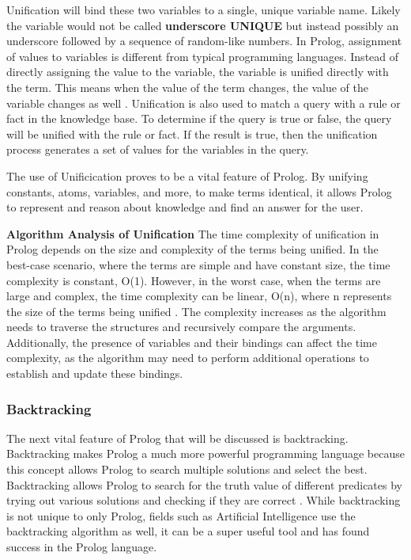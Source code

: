 \documentclass{article}
\theoremstyle{theorem}
\theoremstyle{definition}
\theoremstyle{remark}
\begin{document}
\noindent\newline Unification will bind these two variables to a single, unique variable name. Likely the variable would not be called \textbf{underscore UNIQUE} but instead possibly an underscore followed by a sequence of random-like numbers.  In Prolog, assignment of values to variables is different from typical programming languages. Instead of directly assigning the value to the variable, the variable is unified directly with the term. This means when the value of the term changes, the value of the variable changes as well \cite{(13)}. Unification is also used to match a query with a rule or fact in the knowledge base. To determine if the query is true or false, the query will be unified with the rule or fact. If the result is true, then the unification process generates a set of values for the variables in the query. 

\noindent\newline The use of Unificication proves to be a vital feature of Prolog. By unifying constants, atoms, variables, and more, to make terms identical, it allows Prolog to represent and reason about knowledge and find an answer for the user.


\noindent\newline\newline\textbf{Algorithm Analysis of Unification}
\noindent\newline The time complexity of unification in Prolog depends on the size and complexity of the terms being unified. In the best-case scenario, where the terms are simple and have constant size, the time complexity is constant, O(1). However, in the worst case, when the terms are large and complex, the time complexity can be linear, O(n), where n represents the size of the terms being unified \cite{(14)}. The complexity increases as the algorithm needs to traverse the structures and recursively compare the arguments. Additionally, the presence of variables and their bindings can affect the time complexity, as the algorithm may need to perform additional operations to establish and update these bindings.



\subsubsection{Backtracking}
\noindent\newline The next vital feature of Prolog that will be discussed is backtracking. Backtracking makes Prolog a much more powerful programming language because this concept allows Prolog to search multiple solutions and select the best. Backtracking allows Prolog to search for the truth value of different predicates by trying out various solutions and checking if they are correct \cite{(15)}. While backtracking is not unique to only Prolog, fields such as Artificial Intelligence use the backtracking algorithm as well, it can be a super useful tool and has found success in the Prolog language.
\end{document}
